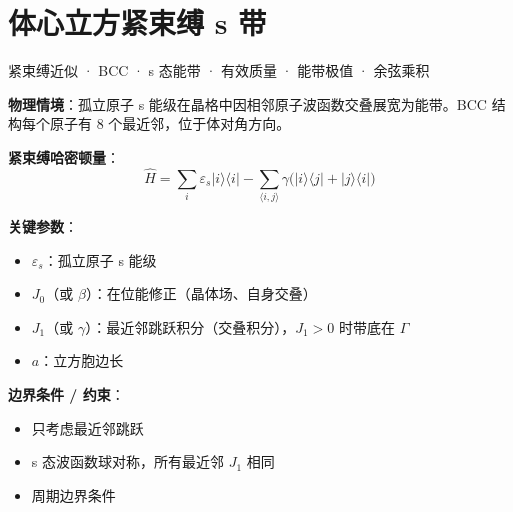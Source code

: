 
\section{体心立方紧束缚 s 带}
\label{sec:tight-binding-bcc}

\begin{tipbox}[关键词标签]
紧束缚近似 · BCC · s 态能带 · 有效质量 · 能带极值 · 余弦乘积
\end{tipbox}

\begin{modelbox}
\textbf{物理情境}：孤立原子 s 能级在晶格中因相邻原子波函数交叠展宽为能带。BCC 结构每个原子有 8 个最近邻，位于体对角方向。

\textbf{紧束缚哈密顿量}：
\[
\hat{H}=\sum_{i}\varepsilon_s|i\rangle\langle i|-\sum_{\langle i,j\rangle}\gamma\bigl(|i\rangle\langle j|+|j\rangle\langle i|\bigr)
\]

\textbf{关键参数}：
\begin{itemize}[nosep]
    \item $\varepsilon_s$：孤立原子 s 能级
    \item $J_0$（或 $\beta$）：在位能修正（晶体场、自身交叠）
    \item $J_1$（或 $\gamma$）：最近邻跳跃积分（交叠积分），$J_1>0$ 时带底在 $\Gamma$
    \item $a$：立方胞边长
\end{itemize}

\textbf{边界条件 / 约束}：
\begin{itemize}[nosep]
    \item 只考虑最近邻跳跃
    \item s 态波函数球对称，所有最近邻 $J_1$ 相同
    \item 周期边界条件
\end{itemize}
\end{modelbox}

